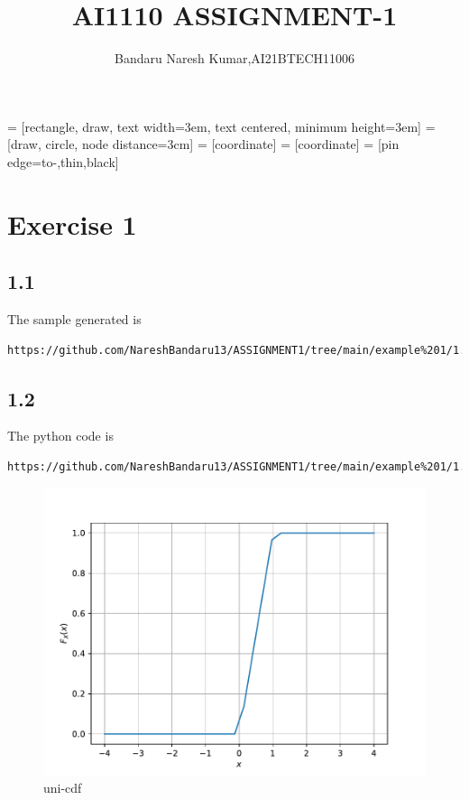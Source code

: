 \documentclass[journal,12pt,twocolumn]{IEEEtran}
\title{AI1110 ASSIGNMENT-1}
\author{Bandaru Naresh Kumar,AI21BTECH11006}
\date{}
\begin{document}
 = [rectangle, draw,
    text width=3em, text centered, minimum height=3em]
 = [draw, circle, node distance=3cm]
 = [coordinate]
 = [coordinate]
 = [pin edge={to-,thin,black}]

\maketitle
\section*{Exercise 1}
\subsection*{1.1}
The sample generated is
\begin{lstlisting}
https://github.com/NareshBandaru13/ASSIGNMENT1/tree/main/example%201/1.1
\end{lstlisting}
\subsection*{1.2}
The python code is
\begin{lstlisting}
https://github.com/NareshBandaru13/ASSIGNMENT1/tree/main/example%201/1.2
\end{lstlisting}
\begin{figure}[H]
    \centering
    \includegraphics[scale=0.5]{figures/uni_cdf.pdf} 
    \caption{uni-cdf}
    \label{fig:my_label1}
\end{figure}
\end{document}
